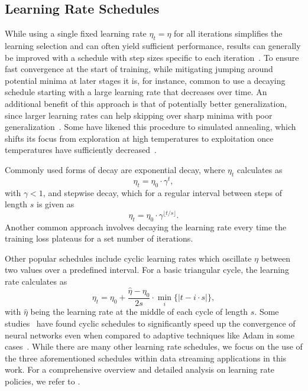 \documentclass[letterpaper]{article} %
\begin{document}
\subsection{Learning Rate Schedules}

While using a single fixed learning rate $\eta_t = \eta$ for all iterations simplifies the learning selection and can often yield sufficient performance, results can generally be improved with a schedule with step sizes specific to each iteration~\cite{wuDemystifyingLearningRate2019b}.
To ensure fast convergence at the start of training, while mitigating jumping around potential minima at later stages it is, for instance, common to use a decaying schedule starting with a large learning rate that decreases over time.
An additional benefit of this approach is that of potentially better generalization, since larger learning rates can help skipping over sharp minima with poor generalization~\cite{hochreiterFlatMinima1997,chaudhariEntropySGDBiasingGradient2017}.
Some have likened this procedure to simulated annealing, which shifts its focus from exploration at high temperatures to exploitation once temperatures have sufficiently decreased~\cite{smithDonDecayLearning2018}.

Commonly used forms of decay are exponential decay, where $\eta_{t}$ calculates as
\begin{equation}
	\eta_{t} = \eta_0 \cdot \gamma^t,
\end{equation}
with $\gamma < 1$, and stepwise decay, which for a regular interval between steps of length $s$ is given as
\begin{equation}
	\eta_{t} = \eta_0 \cdot \gamma^{\lfloor t/s \rfloor}.
\end{equation}
Another common approach involves decaying the learning rate every time the training loss plateaus for a set number of iterations.

Other popular schedules include cyclic learning rates which oscillate $\eta$ between two values over a predefined interval.
For a basic triangular cycle, the learning rate calculates as
\begin{equation}
	\eta_t = \eta_0 + \frac{\hat{\eta} - \eta_0}{2s} \cdot \min_{i} \{|t-i\cdot s|\},
\end{equation}
with $\hat{\eta}$ being the learning rate at the middle of each cycle of length $s$.
Some studies~\cite{smithCyclicalLearningRates2017, smithSuperConvergenceVeryFast2018a} have found cyclic schedules to significantly speed up the convergence of neural networks even when compared to adaptive techniques like Adam in some cases~\cite{kingmaAdamMethodStochastic2017b}.
While there are many other learning rate schedules, we focus on the use of the three aforementioned schedules within data streaming applications in this work.
For a comprehensive overview and detailed analysis on learning rate policies, we refer to \citet{wuDemystifyingLearningRate2019b}.
\end{document}
